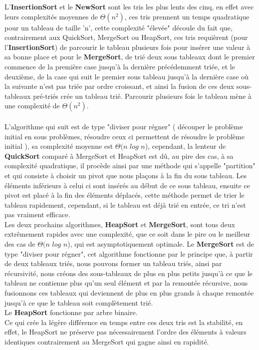 \documentclass[a4paper, 11pt, oneside]{article}
\begin{document}
L'\textbf{InsertionSort} et le \textbf{NewSort} sont les tris les plus lents des cinq, en effet avec leurs complexités moyennes de $\Theta(n^{2})$, ces tris prennent un temps quadratique pour un tableau de taille 'n', cette complexité "élevée" découle du fait que, contrairement aux QuickSort, MergeSort ou HeapSort, ces tris requièrent (pour l'\textbf{InsertionSort}) de parcourir le tableau plusieurs fois pour insérer une valeur à sa bonne place et pour le \textbf{MergeSort}, de trié deux sous tableaux dont le premier commence de la première case jusqu'à la dernière précédemment triée, et le deuxième, de la case qui suit le premier sous tableau jusqu'à la dernière case où la suivante  n'est pas triée par ordre croissant, et ainsi la fusion de ces deux sous-tableaux pré-triés crée un tableau trié.
 Parcourir plusieurs fois le tableau mène à une complexité de $\Theta(n^{2})$.
\\
\\
\indent L'algorithme qui suit est de type "diviser pour régner" ( découper le problème initial en sous problèmes, résoudre ceux ci permettent de résoudre le problème initial ), sa complexité moyenne est $\Theta(n$ $log$ $n$), cependant, la lenteur de \textbf{QuickSort} comparé à MergeSort et HeapSort est dû, au pire des cas, à sa complexité quadratique, il procède ainsi par une méthode qui s'appelle "partition" et qui consiste à choisir un pivot que nous plaçons à la fin du sous tableau. Les éléments inférieurs à celui ci sont insérés au début de ce sous tableau, ensuite ce pivot est placé à la fin des éléments déplacés, cette méthode permet de trier le tableau rapidement, cependant, si le tableau est déjà trié en entrée, ce tri n'est pas vraiment efficace.\\ 

Les deux prochains algorithmes, \textbf{HeapSort} et \textbf{MergeSort}, sont tous deux extrêmement rapides avec une complexité, que ce soit dans le pire ou le meilleur des cas de $\Theta(n$ $log$ $n$),  qui est asymptotiquement optimale. Le \textbf{MergeSort} est de type "diviser pour régner", cet algorithme fonctionne par le principe que, à partir de deux tableaux triés, nous pouvons former un tableau triés, ainsi par récursivité, nous créons des sous-tableaux de plus en plus petits jusqu'à ce que le tableau ne contienne plus qu'un seul élément et par la remontée récursive, nous fusionnons ces tableaux qui deviennent de plus en plus grands à chaque remontée jusqu'à ce que le tableau soit complètement trié.\\ Le \textbf{HeapSort} fonctionne par arbre binaire. \\
Ce qui crée la légère différence en temps entre ces deux tris est la stabilité, en effet, le HeapSort ne préserve pas nécessairement l’ordre des éléments à valeurs identiques contrairement au MergeSort qui gagne ainsi en rapidité.
\end{document}
